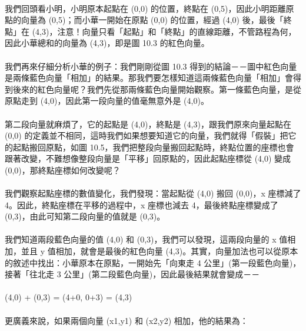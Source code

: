 \documentclass[12pt,a4paper,oneside]{report}
\begin{document}
\begin{CJK}{UTF8}{bkai}
\paragraph{}我們回頭看小明，小明原本起點在 (0,0) 的位置，終點在 (0,5)，因此小明距離原點的向量為 (0,5)；而小華一開始在原點 (0,0) 的位置，經過 (4,0) 後，最後「終點」在 (4,3)，注意！向量只看「起點」和「終點」的直線距離，不管路程為何，因此小華總和的向量為 (4,3)，即是圖 10.3 的紅色向量。
\paragraph{}我們再來仔細分析小華的例子：我們剛剛從圖 10.3 得到的結論－－圖中紅色向量是兩條藍色向量「相加」的結果。那我們要怎樣知道這兩條藍色向量「相加」會得到後來的紅色向量呢？我們先從那兩條藍色向量開始觀察。第一條藍色向量，是從原點走到 (4,0)，因此第一段向量的值毫無意外是 (4,0)。
\paragraph{}第二段向量就麻煩了，它的起點是 (4,0)，終點是 (4,3)，跟我們原來向量起點在 (0,0) 的定義並不相同，這時我們如果想要知道它的向量，我們就得「假裝」把它的起點搬回原點，如圖 10.5，我們把整段向量搬回起點時，終點位置的座標也會跟著改變，不難想像整段向量是「平移」回原點的，因此起點座標從 (4,0) 變成 (0,0)，那終點座標如何改變呢？
\paragraph{}我們觀察起點座標的數值變化，我們發現：當起點從 (4,0) 搬回 (0,0)，x 座標減了 4。因此，終點座標在平移的過程中，x 座標也減去 4，最後終點座標變成了 (0,3)，由此可知第二段向量的值就是 (0,3)。
\paragraph{}我們知道兩段藍色向量的值 (4,0) 和 (0,3)，我們可以發現，這兩段向量的 x 值相加，並且 y 值相加，就會是最後的紅色向量 (4,3)。其實，向量加法也可以從原本的敘述中找出：小華原本在原點，一開始先「向東走 4 公里」(第一段藍色向量)，接著「往北走 3 公里」(第二段藍色向量)，因此最後結果就會變成－－
\paragraph{}(4,0) + (0,3) = (4+0, 0+3) = (4,3)
\paragraph{}更廣義來說，如果兩個向量 (x1,y1) 和 (x2,y2) 相加，他的結果為：

\end{CJK}
\end{document}
